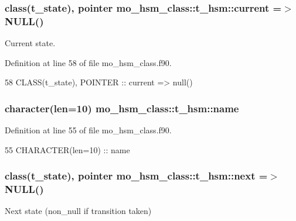 \subsubsection[{current}]{\setlength{\rightskip}{0pt plus 5cm}class({\bf t\+\_\+state}), pointer mo\+\_\+hsm\+\_\+class\+::t\+\_\+hsm\+::current =$>$ N\+U\+L\+L()}\label{structmo__hsm__class_1_1t__hsm_aa44c8241f08804bcb0735ad94de011aa}


Current state. 



Definition at line 58 of file mo\+\_\+hsm\+\_\+class.\+f90.


\begin{DoxyCode}
58     \textcolor{keywordtype}{CLASS}(t\_state), \textcolor{keywordtype}{POINTER}     :: current => null()  
\end{DoxyCode}
\hypertarget{structmo__hsm__class_1_1t__hsm_a41c6532ae5a0ad64e3859551d680e304}{}
\subsubsection[{name}]{\setlength{\rightskip}{0pt plus 5cm}character(len=10) mo\+\_\+hsm\+\_\+class\+::t\+\_\+hsm\+::name}\label{structmo__hsm__class_1_1t__hsm_a41c6532ae5a0ad64e3859551d680e304}


Definition at line 55 of file mo\+\_\+hsm\+\_\+class.\+f90.


\begin{DoxyCode}
55     \textcolor{keywordtype}{CHARACTER(len=10)}           :: name
\end{DoxyCode}
\hypertarget{structmo__hsm__class_1_1t__hsm_a2c0b1b670fbc0073efab59f8257f4486}{}
\subsubsection[{next}]{\setlength{\rightskip}{0pt plus 5cm}class({\bf t\+\_\+state}), pointer mo\+\_\+hsm\+\_\+class\+::t\+\_\+hsm\+::next =$>$ N\+U\+L\+L()}\label{structmo__hsm__class_1_1t__hsm_a2c0b1b670fbc0073efab59f8257f4486}


Next state (non\+\_\+null if transition taken) 



